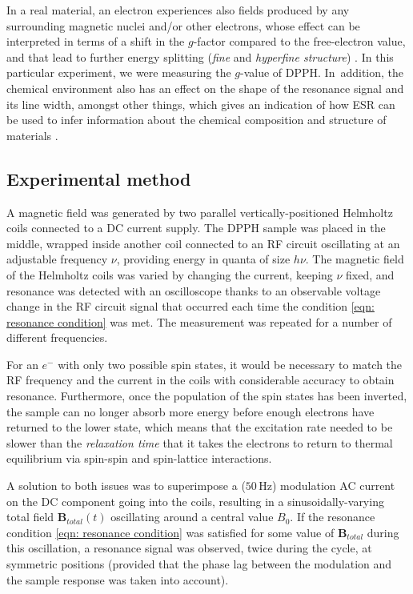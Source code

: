 \documentclass[a4paper]{jpconf}
\numberwithin{equation}{section}
\begin{document}
In a real material, an electron experiences also fields produced by any surrounding magnetic nuclei and/or other electrons, whose effect can be interpreted in terms of a shift in the $g$-factor compared to the free-electron value, and that lead to further energy splitting (\emph{fine} and \emph{hyperfine structure}) \cite{Lancaster, Ball}. In this particular experiment, we were measuring the $g$-value of DPPH. In~addition, the chemical environment also has an effect on the shape of the resonance signal and its line width, amongst other things, which gives an indication of how ESR can be used to infer information about the chemical composition and structure of materials \cite{Lancaster}. 

\subsection{Experimental method}\label{section: method}
A magnetic field was generated by two parallel vertically-positioned Helmholtz coils connected to a DC current supply. The DPPH sample was placed in the middle, wrapped inside another coil connected to an RF circuit oscillating at an adjustable frequency $\nu$, providing energy in quanta of size $h\nu$. The magnetic field of the Helmholtz coils was varied by changing the current, keeping $\nu$ fixed, and resonance was detected with an oscilloscope thanks to an observable voltage change in the RF circuit signal that occurred each time the condition \eqref{eqn: resonance condition} was met. The measurement was repeated for a number of different frequencies.  

For an $e^-$ with only two possible spin states, it would be necessary to match the RF frequency and the current in the coils with considerable accuracy to obtain resonance. Furthermore, once the population of the spin states has been inverted, the sample can no longer absorb more energy before enough electrons have returned to the lower state, which means that the excitation rate needed to be slower than the \emph{relaxation time} that it takes the electrons to return to thermal equilibrium via spin-spin and spin-lattice interactions. 

A solution to both issues was to superimpose a ($50 \, \si{\hertz}$) modulation AC current on the DC component going into the coils, resulting in a sinusoidally-varying total field $\mathbf{B}_{total}(t)$ oscillating around a central value $B_0$. If the resonance condition \eqref{eqn: resonance condition} was satisfied for some value of $\mathbf{B}_{total}$ during this oscillation, a resonance signal was observed, twice during the cycle, at symmetric positions (provided that the phase lag between the modulation and the sample response was taken into account). 
\end{document}
